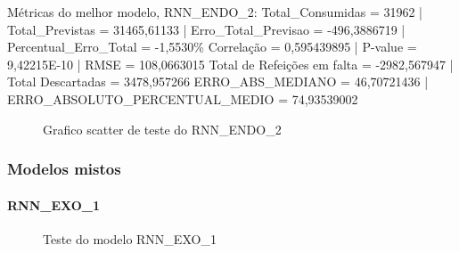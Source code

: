 \documentclass[	12pt, Times, openright, twoside, a4paper, english, brazil]{abntex2}
\begin{document}
            Métricas do melhor modelo, RNN\_ENDO\_2:\newline
            Total\_Consumidas = 31962 | Total\_Previstas = 31465,61133 | Erro\_Total\_Previsao = -496,3886719 | Percentual\_Erro\_Total = -1,5530\%\newline
            Correlação = 0,595439895 | P-value = 9,42215E-10         | RMSE = 108,0663015\newline
            Total de Refeições em falta = -2982,567947 | Total Descartadas = 3478,957266\newline
            ERRO\_ABS\_MEDIANO = 46,70721436 | ERRO\_ABSOLUTO\_PERCENTUAL\_MEDIO = 74,93539002\newline
            \begin{figure}[!ht]
              \caption{Grafico scatter de teste do RNN\_ENDO\_2 \label{fig:case1_rnn_endo2_test_scatter} }
            \end{figure}
    	    \subsubsection{Modelos mistos}
              \paragraph{RNN\_EXO\_1}
                \begin{figure}[!ht]
                  \caption{Teste do modelo RNN\_EXO\_1 \label{fig:case1_rnn_exo_1_test} }
                \end{figure}
\end{document}
